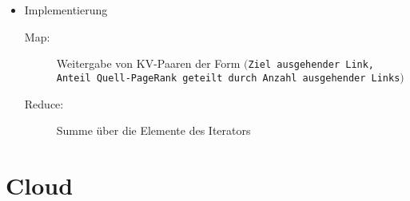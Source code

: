 \begin{itemize}
\begin{itemize}
\begin{itemize}
\begin{itemize}
			\end{itemize}
			\item Implementierung
			\begin{description}
				\item[Map:] Weitergabe von KV-Paaren der Form \texttt{\(\big(\)Ziel ausgehender Link, Anteil Quell-PageRank geteilt durch Anzahl ausgehender Links\(\big)\)}
				\item[Reduce:] Summe über die Elemente des Iterators
			\end{description}
		\end{itemize}
	\end{itemize}
\end{itemize}



\section{Cloud}

